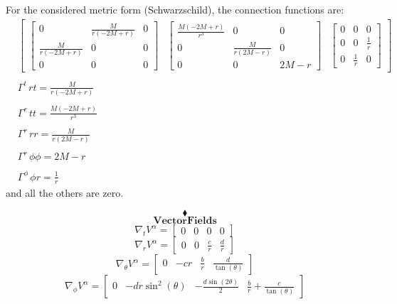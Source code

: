 For the considered metric form (Schwarzschild), the connection functions are:
\begin{align}
&\left[\begin{matrix}\left[\begin{matrix}0 & \frac{M}{r \left(- 2 M + r\right)} & 0\\\frac{M}{r \left(- 2 M + r\right)} & 0 & 0\\0 & 0 & 0\end{matrix}\right] & \left[\begin{matrix}\frac{M \left(- 2 M + r\right)}{r^{3}} & 0 & 0\\0 & \frac{M}{r \left(2 M - r\right)} & 0\\0 & 0 & 2 M - r\end{matrix}\right] & \left[\begin{matrix}0 & 0 & 0\\0 & 0 & \frac{1}{r}\\0 & \frac{1}{r} & 0\end{matrix}\right]\end{matrix}\right]\\\\
&\Gamma^{t}{\,rt}= \frac{M}{r \left(- 2 M + r\right)}\\\\
&\Gamma^{r}{\,tt}= \frac{M \left(- 2 M + r\right)}{r^{3}}\\\\
&\Gamma^{r}{\,rr}= \frac{M}{r \left(2 M - r\right)}\\\\
&\Gamma^{r}{\,\phi\phi}= 2 M - r\\\\
&\Gamma^{\phi}{\,\phi r}= \frac{1}{r}
\end{align}
and all the others are zero.

$$\blacklozenge$$\newpage
\newpage
\newpage
$$\mathbf{Vector Fields}$$
\newpage
$$\nabla_{t}V^{\alpha} = \left[\begin{matrix}0 & 0 & 0 & 0\end{matrix}\right]$$
$$\nabla_{r}V^{\alpha} = \left[\begin{matrix}0 & 0 & \frac{c}{r} & \frac{d}{r}\end{matrix}\right]$$
$$\nabla_{\theta}V^{\alpha} = \left[\begin{matrix}0 & - c r & \frac{b}{r} & \frac{d}{\tan{\left(\theta \right)}}\end{matrix}\right]$$
$$\nabla_{\phi}V^{\alpha} = \left[\begin{matrix}0 & - d r \sin^{2}{\left(\theta \right)} & - \frac{d \sin{\left(2 \theta \right)}}{2} & \frac{b}{r} + \frac{c}{\tan{\left(\theta \right)}}\end{matrix}\right]$$


